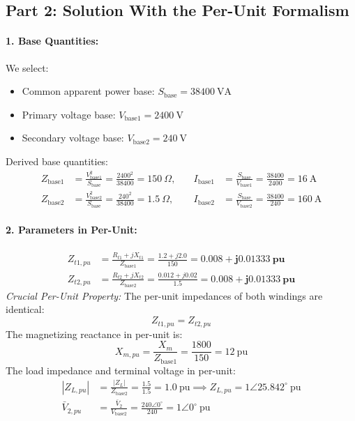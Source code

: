 \newpage
\subsection*{Part 2: Solution With the Per-Unit Formalism}

\paragraph{1. Base Quantities:}
We select:
\begin{itemize}
    \item Common apparent power base: $S_{\text{base}} = 38400\ \text{VA}$
    \item Primary voltage base: $V_{\text{base1}} = 2400\ \text{V}$
    \item Secondary voltage base: $V_{\text{base2}} = 240\ \text{V}$
\end{itemize}
Derived base quantities:
\begin{align}
    Z_{\text{base1}} &= \frac{V_{\text{base1}}^2}{S_{\text{base}}} = \frac{2400^2}{38400} = 150\ \Omega, \quad &I_{\text{base1}} &= \frac{S_{\text{base}}}{V_{\text{base1}}} = \frac{38400}{2400} = 16\ \text{A} \\
    Z_{\text{base2}} &= \frac{V_{\text{base2}}^2}{S_{\text{base}}} = \frac{240^2}{38400} = 1.5\ \Omega, \quad &I_{\text{base2}} &= \frac{S_{\text{base}}}{V_{\text{base2}}} = \frac{38400}{240} = 160\ \text{A}
\end{align}

\paragraph{2. Parameters in Per-Unit:}
\begin{align}
    Z_{t1,pu} &= \frac{R_{t1} + jX_{t1}}{Z_{\text{base1}}} = \frac{1.2 + j2.0}{150} = \mathbf{0.008 + j0.01333\ \text{pu}} \\
    Z_{t2,pu} &= \frac{R_{t2} + jX_{t2}}{Z_{\text{base2}}} = \frac{0.012 + j0.02}{1.5} = \mathbf{0.008 + j0.01333\ \text{pu}}
\end{align}
\textit{Crucial Per-Unit Property:} The per-unit impedances of both windings are identical:
\[
Z_{t1,pu} = Z_{t2,pu}
\]
The magnetizing reactance in per-unit is:
\begin{equation}
    X_{m,pu} = \frac{X_m}{Z_{\text{base1}}} = \frac{1800}{150} = 12\ \text{pu}
\end{equation}
The load impedance and terminal voltage in per-unit:
\begin{align}
    |Z_{L,pu}| &= \frac{|Z_L|}{Z_{\text{base2}}} = \frac{1.5}{1.5} = 1.0\ \text{pu} \implies Z_{L,pu} = 1\angle 25.842^\circ\ \text{pu} \\
    \bar{V}_{2,pu} &= \frac{\bar{V}_2}{V_{\text{base2}}} = \frac{240\angle 0^\circ}{240} = 1\angle 0^\circ\ \text{pu}
\end{align}

